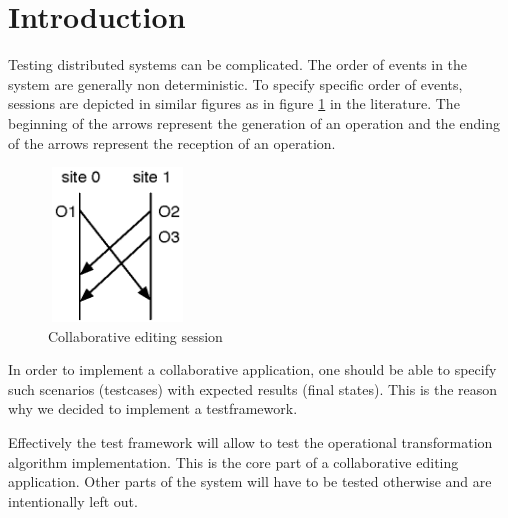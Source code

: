 \documentclass[11pt,a4paper]{article}
\begin{document}
\setlength{\parindent}{0pt}


\newpage

\tableofcontents
\newpage

\listoftables
\listoffigures
\newpage



\section{Introduction}
Testing distributed systems can be complicated. The order of events in the system are generally non deterministic. To specify specific order of events, sessions are depicted in similar figures as in figure \ref{fig:session} in the literature. The beginning of the arrows represent the generation of an operation and the ending of the arrows represent the reception of an operation.

\begin{figure}[H]
 \centering
 \includegraphics[width=3.7cm,height=4.1cm]{../../images/testframework_puzzle.eps}
 \caption{Collaborative editing session}
 \label{fig:session}
\end{figure}

In order to implement a collaborative application, one should be able to specify such scenarios (testcases) with expected results (final states). This is the reason why we decided to implement a testframework.

Effectively the test framework will allow to test the operational transformation algorithm implementation. This is the core part of a collaborative editing application. Other parts of the system will have to be tested otherwise and are intentionally left out.
\end{document}
